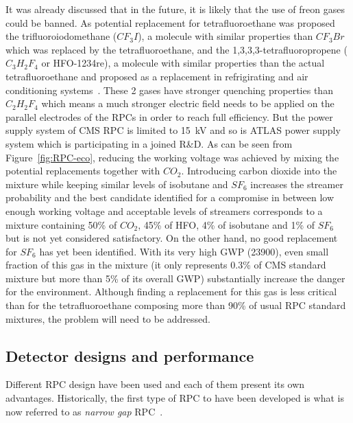 	It was already discussed that in the future, it is likely that the use of freon gases could be banned. As potential replacement for tetrafluoroethane was proposed the trifluoroiodomethane ($CF_3I$), a molecule with similar properties than $CF_3Br$ which was replaced by the tetrafluoroethane, and the 1,3,3,3-tetrafluoropropene ($C_3H_2F_4$ or HFO-1234re), a molecule with similar properties than the actual tetrafluoroethane and proposed as a replacement in refrigirating and air conditioning systems~\cite{HFO2015}. These 2 gases have stronger quenching properties than $C_2H_2F_4$ which means a much stronger electric field needs to be applied on the parallel electrodes of the RPCs in order to reach full efficiency. But the power supply system of CMS RPC is limited to \SI{15}{kV} and so is ATLAS power supply system which is participating in a joined R\&D. As can be seen from Figure~\ref{fig:RPC-eco}, reducing the working voltage was achieved by mixing the potential replacements together with $CO_2$. Introducing carbon dioxide into the mixture while keeping similar levels of isobutane and $SF_6$ increases the streamer probability and the best candidate identified for a compromise in between low enough working voltage and acceptable levels of streamers corresponds to a mixture containing 50\% of $CO_2$, 45\% of HFO, 4\% of isobutane and 1\% of $SF_6$ but is not yet considered satisfactory. On the other hand, no good replacement for $SF_6$ has yet been identified. With its very high \acl{GWP} (23900), even small fraction of this gas in the mixture (it only represents 0.3\% of CMS standard mixture but more than 5\% of its overall GWP) substantially increase the danger for the environment. Although finding a replacement for this gas is less critical than for the tetrafluoroethane composing more than 90\% of usual RPC standard mixtures, the problem will need to be addressed.
	
	\subsection{Detector designs and performance}
	\label{chapt4:ssec:design}
	
	Different RPC design have been used and each of them present its own advantages. Historically, the first type of RPC to have been developed is what is now referred to as \textit{narrow gap} RPC~\cite{SANTONICO81,ZEBALLOS96COMP}.
	
